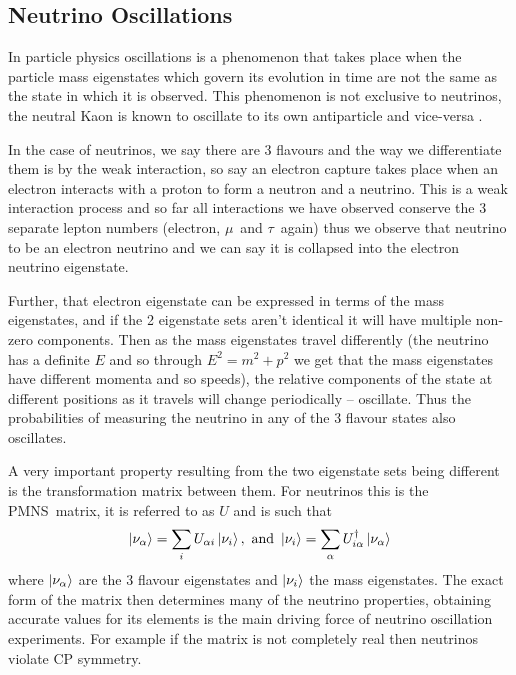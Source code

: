 \documentclass[a4paper,12pt]{article}
\newcommand{\Mu}{$\mu$}
\newcommand{\Tau}{$\tau$}
\begin{document}
\subsection{Neutrino Oscillations}
In particle physics oscillations is a phenomenon that takes place when the particle mass eigenstates which govern its evolution in time are not the same as the state in which it is observed.
This phenomenon is not exclusive to neutrinos, the neutral Kaon is known to oscillate to its own antiparticle and vice-versa \cite{burkhardtWavelengthNeutrinoNeutral2003}.

In the case of neutrinos, we say there are 3 flavours and the way we differentiate them is by the weak interaction, so say an electron capture takes place when an electron interacts with a proton to form a neutron and a neutrino.
This is a weak interaction process and so far all interactions we have observed conserve the 3 separate lepton numbers (electron, \Mu\ and \Tau\ again) thus we observe that neutrino to be an electron neutrino and we can say it is collapsed into the electron neutrino eigenstate.

Further, that electron eigenstate can be expressed in terms of the mass eigenstates, and if the 2 eigenstate sets aren't identical it will have multiple non-zero components.
Then as the mass eigenstates travel differently (the neutrino has a definite $E$ and so through $E^2 = m^2 + p^2$ we get that the mass eigenstates have different momenta and so speeds), the relative components of the state at different positions as it travels will change periodically -- oscillate.
Thus the probabilities of measuring the neutrino in any of the 3 flavour states also oscillates.

A very important property resulting from the two eigenstate sets being different is the transformation matrix between them.
For neutrinos this is the PMNS\footnotemark\ matrix, it is referred to as $U$ and is such that 
\begin{equation}
    \ket{\nu_\alpha} = \sum_i U_{\alpha i} \ket{\nu_i}, \text{ and }
    \ket{\nu_i} = \sum_\alpha U^\dag_{i \alpha} \ket{\nu_\alpha}
\end{equation}
where $\ket{\nu_\alpha}$ are the 3 flavour eigenstates and $\ket{\nu_i}$ the mass eigenstates.
The exact form of the matrix then determines many of the neutrino properties, obtaining accurate values for its elements is the main driving force of neutrino oscillation experiments.
For example if the matrix is not completely real then neutrinos violate CP symmetry.
\end{document}
